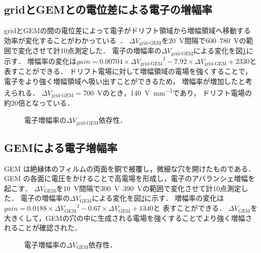 \documentclass[../master]{subfiles}
\begin{document}
\subsection{gridとGEMとの電位差による電子の増幅率}
gridとGEMの間の電位差によって電子がドリフト領域から増幅領域へ移動する効率が変化することがわかっている~\cite{furuno}．
$\Delta V_{\text{grid-GEM}}$を\SI{20}{\volt}間隔で\SI{600}{}--\SI{780}{\volt}の範囲で変化させて計10点測定した．
電子の増幅率の$\Delta V_{\text{grid-GEM}}$による変化を図\ref{fig::gain_grid_GEM_V_dep}に示す．
増幅率の変化は$\mathit{gain} = 0.00704\times{\Delta V_{\text{grid-GEM}}}^2-7.92\times{\Delta V_{\text{grid-GEM}}}+2330$と
表すことができる．
ドリフト電場に対して増幅領域の電場を強くすることで，電子をより強く増幅領域へ吸い出すことができるため，
増幅率が増加したと考えられる．
$\Delta V_{\text{grid-GEM}} = $\SI{700}{\volt}のとき，\SI{140}{\volt\per\milli\metre}であり，
ドリフト電場の約20倍となっている．
\begin{figure}
  \centering
  \scalebox{0.7}{}
  \caption{電子増幅率の$\Delta V_{\text{grid-GEM}}$依存性．}
  \label{fig::gain_grid_GEM_V_dep}
\end{figure}

\subsection{GEMによる電子増幅率}
GEM は絶縁体のフィルムの両面を銅で被覆し，微細な穴を開けたものである．
GEM の各面に電圧をかけることで高電場を形成し，電子のアバランシェ増幅を起こす．
$\Delta V_{\text{GEM}}$を\SI{10}{\volt}間隔で\SIrange{300}{390}{\volt}の範囲で変化させて計10点測定した．
電子の増幅率の$\Delta V_{\text{GEM}}$による変化を図\ref{fig::gain_GEM_V_dep}に示す．
増幅率の変化は$\mathit{gain} = 0.0188\times{\Delta V_{\text{GEM}}}^2-0.67\times{\Delta V_{\text{GEM}}}+1340$と
表すことができる．
$\Delta V_{\text{GEM}}$を大きくして，GEMの穴の中に生成される電場を強くすることでより強く増幅されることが確認された．
\begin{figure}
  \centering
  \scalebox{0.7}{}
  \caption{電子増幅率の$\Delta V_{\text{GEM}}$依存性．}
  \label{fig::gain_GEM_V_dep}
\end{figure}
\end{document}
